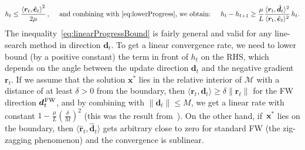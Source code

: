 \documentclass{article} %
\newcommand{\domain}{\mathcal{M}} %
\newcommand{\FW}{{\hspace{0.05em}\textnormal{FW}}}
\newcommand{\x}{\bm{x}}
\newcommand{\dd}{\bm{d}}
\renewcommand{\r}{\bm{r}}
\newcommand{\innerProd}[2]{\left\langle #1 , #2 \right\rangle}
\newcommand{\innerProdCompressed}[2]{\langle #1 , #2 \rangle}
\newcommand{\err}{\bm{e}} %
\newcommand{\0}{\mathbf{0}} %
\begin{document}
\begin{equation} \label{eq:linearProgressBound}
h_t \leq \frac{\innerProd{\r_t}{\hat{\err}_t}^2}{2 \mu} \, , \quad \text{ and
combining with \eqref{eq:lowerProgress}, we obtain: } \quad h_{t} - h_{t+1}
\geq \frac{\mu}{L}
\frac{\innerProdCompressed{\r_t}{\hat{\dd}_t}^2}{\innerProdCompressed{\r_t}{\hat{\err}_t}^2} \, h_t .
\end{equation}
%
The inequality~\eqref{eq:linearProgressBound} is
fairly general and valid for any line-search method in direction $\dd_t$. To
get a linear convergence rate, we need to lower bound (by a positive
constant) the term in front of $h_t$ on the RHS, which depends on the angle
between the update direction $\dd_t$ and the negative gradient~$\r_t$. If we
assume that the solution $\x^*$ lies in the relative interior of $\domain$
with a distance of at least $\delta > 0$ from the boundary, then
$\innerProdCompressed{\r_t}{\dd_t} \geq \delta \|\r_t\|$ for the FW direction
$\dd_t^\FW$, and by combining with $\|\dd_t\| \leq M$, we get a linear rate with constant
$1-\frac{\mu}{L}(\frac{\delta}{M})^2$ (this was the result
from~\citep{Guelat:1986fq}). On the other hand, if~$\x^*$ lies
on the boundary, then $\innerProdCompressed{\hat{\r}_t}{\hat{\dd}_t}$ %
gets
arbitrary close to zero for standard FW (the zig-zagging phenomenon) and the
convergence is sublinear.
\end{document}
